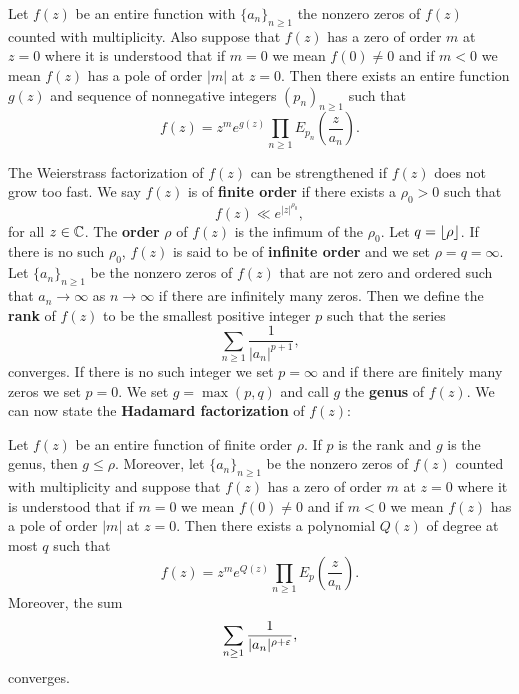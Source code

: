     \begin{theorem}
      Let $f(z)$ be an entire function with $\{a_{n}\}_{n \ge 1}$ the nonzero zeros of $f(z)$ counted with multiplicity. Also suppose that $f(z)$ has a zero of order $m$ at $z = 0$ where it is understood that if $m = 0$ we mean $f(0) \neq 0$ and if $m < 0$ we mean $f(z)$ has a pole of order $|m|$ at $z = 0$. Then there exists an entire function $g(z)$ and sequence of nonnegative integers $(p_{n})_{n \ge 1}$ such that
      \[
        f(z) = z^{m}e^{g(z)}\prod_{n \ge 1}E_{p_{n}}\left(\frac{z}{a_{n}}\right).
      \]
    \end{theorem}

    The Weierstrass factorization of $f(z)$ can be strengthened if $f(z)$ does not grow too fast. We say $f(z)$ is of \textbf{finite order} if there exists a $\rho_{0} > 0$ such that
    \[
      f(z) \ll e^{|z|^{\rho_{0}}},
    \]
    for all $z \in \mathbb{C}$. The \textbf{order} $\rho$ of $f(z)$ is the infimum of the $\rho_{0}$. Let $q = \lfloor \rho \rfloor$. If there is no such $\rho_{0}$, $f(z)$ is said to be of \textbf{infinite order} and we set $\rho = q = \infty$. Let $\{a_{n}\}_{n \ge 1}$ be the nonzero zeros of $f(z)$ that are not zero and ordered such that $a_{n} \to \infty$ as $n \to \infty$ if there are infinitely many zeros. Then we define the \textbf{rank} of $f(z)$ to be the smallest positive integer $p$ such that the series
    \[
      \sum_{n \ge 1}\frac{1}{|a_{n}|^{p+1}},
    \]
    converges. If there is no such integer we set $p = \infty$ and if there are finitely many zeros we set $p = 0$. We set $g = \max(p,q)$ and call $g$ the \textbf{genus} of $f(z)$. We can now state the \textbf{Hadamard factorization} of $f(z)$:

    \begin{theorem}
      Let $f(z)$ be an entire function of finite order $\rho$. If $p$ is the rank and $g$ is the genus, then $g \le \rho$. Moreover, let $\{a_{n}\}_{n \ge 1}$ be the nonzero zeros of $f(z)$ counted with multiplicity and suppose that $f(z)$ has a zero of order $m$ at $z = 0$ where it is understood that if $m = 0$ we mean $f(0) \neq 0$ and if $m < 0$ we mean $f(z)$ has a pole of order $|m|$ at $z = 0$. Then there exists a polynomial $Q(z)$ of degree at most $q$ such that
      \[
        f(z) = z^{m}e^{Q(z)}\prod_{n \ge 1}E_{p}\left(\frac{z}{a_{n}}\right).
      \]
      Moreover, the sum
      \[
        \sum_{n \ge 1}\frac{1}{|a_{n}|^{\rho+\varepsilon}},
      \]
      converges.
    \end{theorem}
